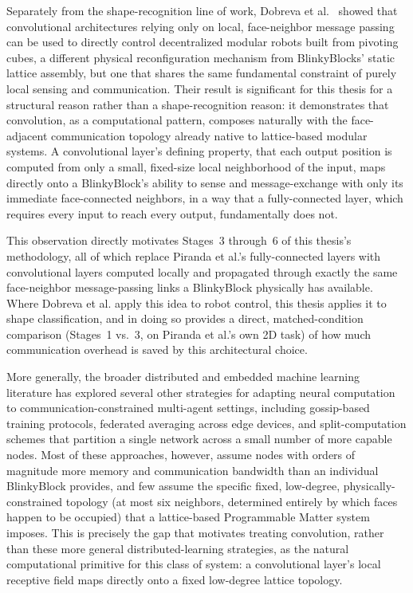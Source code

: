 \documentclass[12pt,a4paper]{report}
\begin{document}
Separately from the shape-recognition line of work, Dobreva et al.~\cite{dobreva} showed that convolutional architectures relying only on local, face-neighbor message passing can be used to directly control decentralized modular robots built from pivoting cubes, a different physical reconfiguration mechanism from BlinkyBlocks' static lattice assembly, but one that shares the same fundamental constraint of purely local sensing and communication. Their result is significant for this thesis for a structural reason rather than a shape-recognition reason: it demonstrates that convolution, as a computational pattern, composes naturally with the face-adjacent communication topology already native to lattice-based modular systems. A convolutional layer's defining property, that each output position is computed from only a small, fixed-size local neighborhood of the input, maps directly onto a BlinkyBlock's ability to sense and message-exchange with only its immediate face-connected neighbors, in a way that a fully-connected layer, which requires every input to reach every output, fundamentally does not.

This observation directly motivates Stages~3 through~6 of this thesis's methodology, all of which replace Piranda et al.'s fully-connected layers with convolutional layers computed locally and propagated through exactly the same face-neighbor message-passing links a BlinkyBlock physically has available. Where Dobreva et al. apply this idea to robot control, this thesis applies it to shape classification, and in doing so provides a direct, matched-condition comparison (Stages~1 vs.~3, on Piranda et al.'s own 2D task) of how much communication overhead is saved by this architectural choice.

More generally, the broader distributed and embedded machine learning literature has explored several other strategies for adapting neural computation to communication-constrained multi-agent settings, including gossip-based training protocols, federated averaging across edge devices, and split-computation schemes that partition a single network across a small number of more capable nodes. Most of these approaches, however, assume nodes with orders of magnitude more memory and communication bandwidth than an individual BlinkyBlock provides, and few assume the specific fixed, low-degree, physically-constrained topology (at most six neighbors, determined entirely by which faces happen to be occupied) that a lattice-based Programmable Matter system imposes. This is precisely the gap that motivates treating convolution, rather than these more general distributed-learning strategies, as the natural computational primitive for this class of system: a convolutional layer's local receptive field maps directly onto a fixed low-degree lattice topology.
\end{document}
